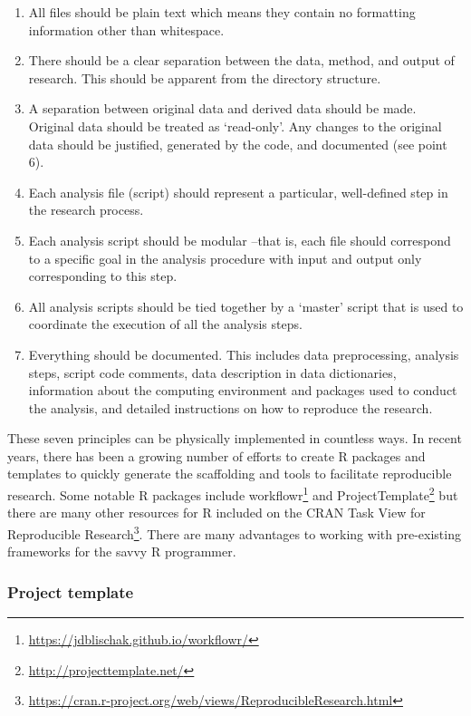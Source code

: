 \documentclass[
  letterpaper,
]{latex/krantz}
\providecommand{\tightlist}{%
  \setlength{\itemsep}{0pt}\setlength{\parskip}{0pt}}\usepackage{longtable,booktabs,array}
\DeclareRobustCommand{\href}[2]{#2\footnote{\url{#1}}}
\begin{document}
\begin{enumerate}
\def\labelenumi{\arabic{enumi}.}
\tightlist
\item
  All files should be plain text which means they contain no formatting
  information other than whitespace.
\item
  There should be a clear separation between the data, method, and
  output of research. This should be apparent from the directory
  structure.
\item
  A separation between original data and derived data should be made.
  Original data should be treated as `read-only'. Any changes to the
  original data should be justified, generated by the code, and
  documented (see point 6).
\item
  Each analysis file (script) should represent a particular,
  well-defined step in the research process.
\item
  Each analysis script should be modular --that is, each file should
  correspond to a specific goal in the analysis procedure with input and
  output only corresponding to this step.
\item
  All analysis scripts should be tied together by a `master' script that
  is used to coordinate the execution of all the analysis steps.
\item
  Everything should be documented. This includes data preprocessing,
  analysis steps, script code comments, data description in data
  dictionaries, information about the computing environment and packages
  used to conduct the analysis, and detailed instructions on how to
  reproduce the research.
\end{enumerate}

These seven principles can be physically implemented in countless ways.
In recent years, there has been a growing number of efforts to create R
packages and templates to quickly generate the scaffolding and tools to
facilitate reproducible research. Some notable R packages include
\href{https://jdblischak.github.io/workflowr/}{workflowr} and
\href{http://projecttemplate.net/}{ProjectTemplate} but there are many
other resources for R included on the
\href{https://cran.r-project.org/web/views/ReproducibleResearch.html}{CRAN
Task View for Reproducible Research}. There are many advantages to
working with pre-existing frameworks for the savvy R programmer.

\hypertarget{fr-project-template}{%
\subsubsection{Project template}\label{fr-project-template}}
\end{document}
